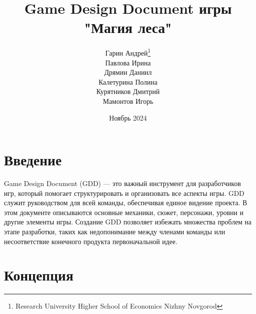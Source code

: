 \documentclass{article}
\title{Game Design Document игры "Магия леса"}
\author{
Гарин Андрей\footnote{Research University Higher School of Economics Nizhny Novgorod} \\
Павлова Ирина \\
Дрямин Даниил \\
Калетурина Полина \\
Курятников Дмитрий \\
Мамонтов Игорь
}
\date{Ноябрь 2024}
\begin{document}
\maketitle

\tableofcontents
\newpage

\section{Введение}

Game Design Document (GDD) — это важный инструмент для разработчиков
игр, который помогает структурировать и организовать все аспекты игры.
GDD служит руководством для всей команды, обеспечивая единое видение
проекта. В этом документе описываются основные механики, сюжет, персонажи,
уровни и другие элементы игры. Создание GDD позволяет избежать множества
проблем на этапе разработки, таких как недопонимание между членами
команды или несоответствие конечного продукта первоначальной идее.

\section{Концепция}
\end{document}
